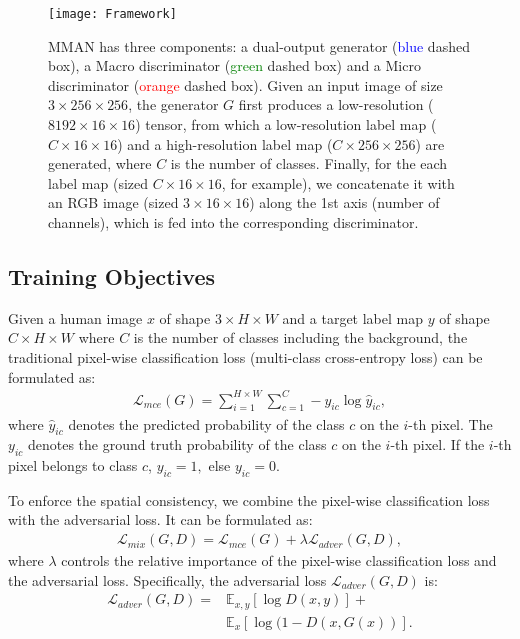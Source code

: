 \documentclass[runningheads]{llncs}
\begin{document}
\begin{figure}[t]
\centering
\texttt{[image: Framework]}
\caption{MMAN has three components: a dual-output generator (\textcolor{blue}{blue} dashed box), a Macro discriminator (\textcolor{green}{green} dashed box) and a Micro discriminator (\textcolor{red}{orange} dashed box). Given an input image of size $3\times256\times256$, the generator $G$ first produces a low-resolution ($8192\times16\times16$) tensor, from which a low-resolution label map ($C\times16\times16$) and a high-resolution label map ($C\times256\times256$) are generated, where $C$ is the number of classes.
Finally, for the each label map (sized $C\times16\times16$, for example), we concatenate it with an RGB image (sized $3\times16\times16$) along the 1st axis (number of channels), which is fed into the corresponding discriminator.}
\label{fig:Framework}
\end{figure}

\subsection{Training Objectives} \label{sec:obj}
Given a  human image $x$ of shape $3\times H\times W$  and a target label map $y$ of shape $C\times H\times W$ where $C$ is the number of classes including the background, the traditional pixel-wise classification loss (multi-class cross-entropy loss) can be formulated as:
\begin{align}
	\mathcal{L}_{mce}(G) = \sum_{i=1}^{H\times W}\sum_{c=1}^{C} - y_{ic}\log{\hat{y}_{ic}},\label{mce}
\end{align}
where $\hat{y}_{ic}$ denotes the predicted probability of the class $c$ on the $i$-th pixel. The $y_{ic}$ denotes the ground truth probability of the class $c$ on the $i$-th pixel. If the $i$-th pixel belongs to class $c$, $y_{ic}=1,$ else $y_{ic}=0$.

To enforce the spatial consistency, we combine the pixel-wise classification loss with the adversarial loss. It can be formulated as:
\begin{align}
    \mathcal{L}_{mix}(G, D) = \mathcal{L}_{mce}(G) + \lambda \mathcal{L}_{adver}(G, D),\label{mixed}
\end{align}
where $\lambda$ controls the relative importance of the pixel-wise classification loss and the adversarial loss. Specifically, the adversarial loss $\mathcal{L}_{adver}(G, D)$ is:
\begin{align}
    \mathcal{L}_{adver}(G,D) = &\mathbb{E}_{x,y}[\log D(x,y)] + \nonumber \\
                 &\mathbb{E}_{x}[\log (1-D(x,G(x))].\label{cGAN_equation}
\end{align}
\end{document}
